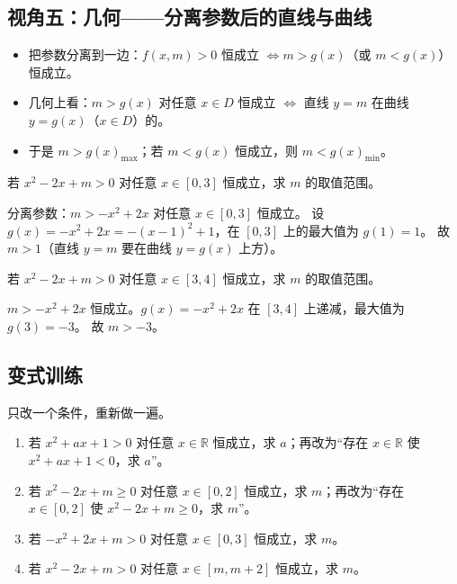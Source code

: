 \begin{explore}
\subsection{视角五：几何——分离参数后的直线与曲线}

\begin{itemize}
  \item 把参数分离到一边：$f(x,m)>0$ 恒成立 $\iff m>g(x)$（或 $m<g(x)$）恒成立。
  \item 几何上看：$m>g(x)$ 对任意 $x\in D$ 恒成立 $\iff$ 直线 $y=m$ 在曲线 $y=g(x)$（$x\in D$）的。
  \item 于是 $m>g(x)_{\max}$；若 $m<g(x)$ 恒成立，则 $m<g(x)_{\min}$。
\end{itemize}

\begin{example}
若 $x^2-2x+m>0$ 对任意 $x\in[0,3]$ 恒成立，求 $m$ 的取值范围。
\end{example}
\begin{solution}
分离参数：$m>-x^2+2x$ 对任意 $x\in[0,3]$ 恒成立。
设 $g(x)=-x^2+2x=-(x-1)^2+1$，在 $[0,3]$ 上的最大值为 $g(1)=1$。
故 $m>1$（直线 $y=m$ 要在曲线 $y=g(x)$ 上方）。
\end{solution}

\begin{problem}
若 $x^2-2x+m>0$ 对任意 $x\in[3,4]$ 恒成立，求 $m$ 的取值范围。
\end{problem}
\begin{solution}
$m>-x^2+2x$ 恒成立。$g(x)=-x^2+2x$ 在 $[3,4]$ 上递减，最大值为 $g(3)=-3$。
故 $m>-3$。
\end{solution}
\end{explore}

\begin{inclasstest}
\subsection{变式训练}
只改一个条件，重新做一遍。
\begin{enumerate}
  \item 若 $x^2+ax+1>0$ 对任意 $x\in\mathbb{R}$ 恒成立，求 $a$；再改为“存在 $x\in\mathbb{R}$ 使 $x^2+ax+1<0$，求 $a$”。
  \item 若 $x^2-2x+m\geq0$ 对任意 $x\in[0,2]$ 恒成立，求 $m$；再改为“存在 $x\in[0,2]$ 使 $x^2-2x+m\geq0$，求 $m$”。
  \item 若 $-x^2+2x+m>0$ 对任意 $x\in[0,3]$ 恒成立，求 $m$。
  \item 若 $x^2-2x+m>0$ 对任意 $x\in[m,m+2]$ 恒成立，求 $m$。
\end{enumerate}
\end{inclasstest}

